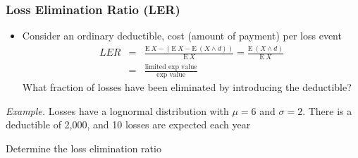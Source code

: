 \documentclass{beamer}
\begin{document}
\begin{frame}[shrink=2]
\frametitle{Loss Elimination Ratio (LER)}
\begin{itemize}
\item Consider an ordinary deductible, cost (amount of payment) per loss event
\begin{eqnarray*}
LER&=&\frac{\mathrm{E~}X - (\mathrm{E~}X-\mathrm{E~}(X\wedge
d))}{\mathrm{E~}X}
=\frac{\mathrm{E~}(X\wedge d)}{\mathrm{E~}X}\\
&=&\frac{\text{limited exp value}}{\text{exp value}}
\end{eqnarray*}
What fraction of losses have been eliminated by introducing the deductible?\\
\end{itemize}

\textit{Example.} Losses have a lognormal distribution with $\mu=6$
and $\sigma=2$. There is a deductible of 2,000, and 10 losses are
expected each year \vspace{2mm}

Determine the loss elimination ratio

\end{frame}
\end{document}
